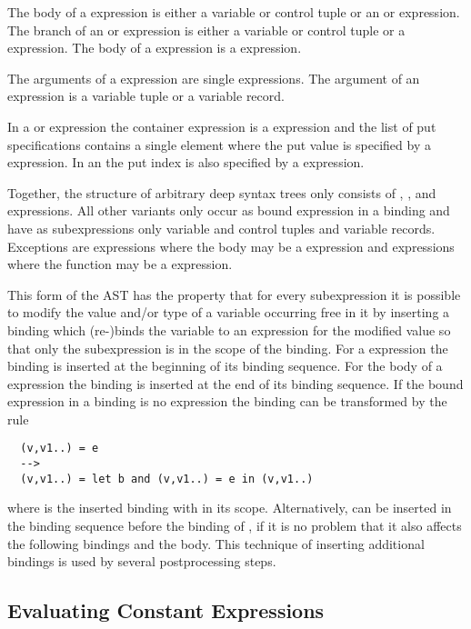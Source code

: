 The body of a  expression is either a variable or control tuple or an  or  expression.
The branch of an  or  expression is either a variable or control tuple or a  expression.
The body of a  expression is a  expression.

The arguments of a  expression are single  expressions. The argument of an  expression
is a variable tuple or a variable record.

In a  or  expression the container expression is a  expression and the list of put
specifications contains a single element where the put value is specified by a  expression. In an 
the put index is also specified by a  expression.

Together, the structure of arbitrary deep syntax trees only consists of , , and  expressions.
All other variants only occur as bound expression in a binding and have as subexpressions only variable and control tuples and
variable records. Exceptions are  expressions where the body may be a  expression and 
expressions where the function may be a  expression.

This form of the AST has the property that for every subexpression it is possible to modify the value and/or type of
a variable occurring free in it by inserting a binding which (re-)binds the variable to an expression for the modified value
so that only the subexpression is in the scope of the binding. For a  expression the binding is inserted at the
beginning of its binding sequence. For the body of a  expression the binding is inserted at the end of its
binding sequence. If the bound expression  in a binding is no  expression the binding can be transformed
by the rule
\begin{verbatim}
  (v,v1..) = e
  -->
  (v,v1..) = let b and (v,v1..) = e in (v,v1..)
\end{verbatim}
where  is the inserted binding with  in its scope. Alternatively,  can be inserted in the binding
sequence before the binding of , if it is no problem that it also affects the following bindings and the 
body. This technique of inserting additional bindings is used by several postprocessing steps.

\subsection{Evaluating Constant Expressions}
\label{impl-post-const}


